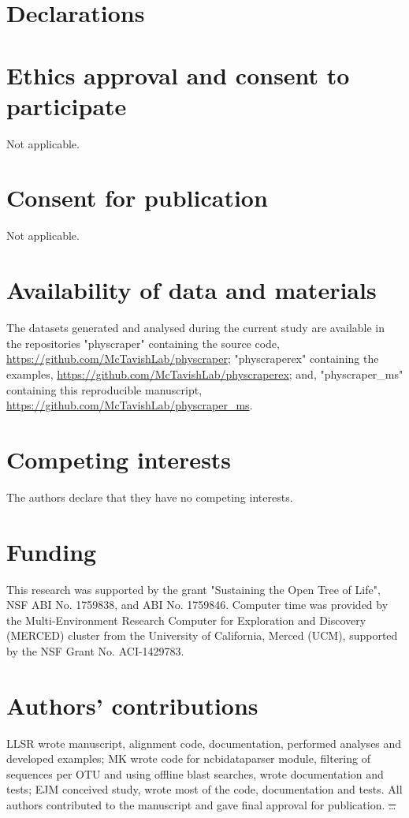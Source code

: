 \documentclass{bmcart}
\providecommand{\DIFdeltex}[1]{{\protect\color{red}\sout{#1}}}                      %
\providecommand{\DIFdelbegin}{} %
\providecommand{\DIFdelend}{} %
\providecommand{\DIFdel}[1]{\texorpdfstring{\DIFdeltex{#1}}{}} %
\begin{document}
\section*{Declarations}

\begin{backmatter}

\section*{Ethics approval and consent to participate}
Not applicable.

\section*{Consent for publication}
Not applicable.

\section*{Availability of data and materials}

The datasets generated and analysed during the current study are available in
the repositories "physcraper" containing the source code,
\href{https://github.com/McTavishLab/physcraper}{https://github.com/McTavishLab/physcraper};
"physcraperex" containing the examples,
\href{https://github.com/McTavishLab/physcraperex}{https://github.com/McTavishLab/physcraperex};
and, "physcraper\_ms" containing this reproducible manuscript,
\href{https://github.com/McTavishLab/physcraper\_ms}{https://github.com/McTavishLab/physcraper\_ms}.

\section*{Competing interests}
The authors declare that they have no competing interests.

\section*{Funding}
This research was supported by the grant "Sustaining the Open Tree of Life", NSF ABI
No. 1759838, and ABI No. 1759846.
Computer time was provided by the Multi-Environment Research Computer for
Exploration and Discovery (MERCED) cluster from the University of California,
Merced (UCM), supported by the NSF Grant No. ACI-1429783.

\section*{Authors' contributions}
LLSR wrote manuscript, alignment code, documentation, performed analyses and developed examples; MK wrote code for ncbidataparser module, filtering of sequences per OTU and using offline blast searches, wrote documentation and tests; EJM conceived study, wrote most of the code, documentation and tests.
All authors contributed to the manuscript and gave final approval for publication.
\DIFdelbegin \DIFdel{\ldots
}\DIFdelend 



\end{backmatter}
\end{document}

